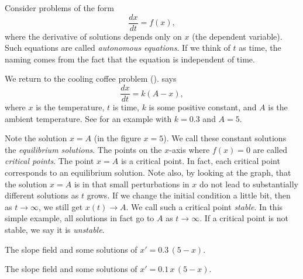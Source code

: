 
Consider
problems of the form
\begin{equation*}
\frac{dx}{dt} = f(x) ,
\end{equation*}
where the derivative of solutions depends only on $x$ (the dependent
variable).  Such equations are called \emph{autonomous
equations}.  If we think
of $t$ as time, the naming comes from the fact that the equation is
independent of time.

We return to the cooling coffee problem
().
says
\begin{equation*}
\frac{dx}{dt} = k (A-x) ,
\end{equation*}
where $x$ is the temperature, $t$ is time, $k$ is some positive constant,
and $A$ is
the ambient temperature.  See  for an example
with $k=0.3$ and $A=5$.

Note the solution $x=A$ (in the figure $x=5$).
We call these constant solutions the
\emph{equilibrium solutions}.
The points on the $x$-axis where $f(x) = 0$ are called
\emph{critical points}.  The point
$x=A$ is a critical point.  In fact, each
critical point corresponds to an equilibrium solution.
Note also, by looking at the graph, that the solution $x=A$ is
 in
that small perturbations in $x$ do not lead to substantially different
solutions as $t$ grows.
If we change the initial condition a little bit, then as 
$t \to \infty$, we still get $x(t) \to A$.
We call such a critical point
\emph{stable}.
In this simple example, all solutions in fact go to $A$
as $t \to \infty$.  If a critical point is not stable, we say it is
\emph{unstable}.

\begin{myfig}
\parbox[t]{3.0in}{
 \capstart
 \caption{The slope field and some solutions of
 $x' = 0.3\,(5-x)$.\label{2.2:coffeefig}}
}
\quad
\parbox[t]{3.0in}{
 \capstart
 \caption{The slope field and some solutions of
 $x' = 0.1\,x\,(5-x)$.\label{2.2:logisticfig}}
}
\end{myfig}

